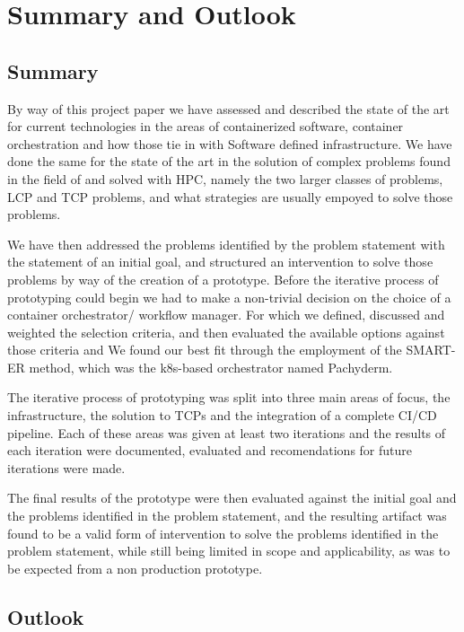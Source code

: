 \chapter{Summary and Outlook}
\label{summary}
 
\section{Summary}

By way of this project paper we have assessed and described the state of the art for current technologies in the areas of 
containerized software, container orchestration and how those tie in with Software defined infrastructure.
We have done the same for the state of the art in the solution of complex problems found in the field of and  solved with \ac{HPC},
namely the two larger classes of problems, \ac{LCP} and \ac{TCP} problems, and what strategies are usually empoyed to solve those problems.

We have then addressed the problems identified by the problem statement with the statement of an initial goal, 
and structured an intervention to solve those problems by way of the creation of a prototype.
Before the iterative process of prototyping could begin we had to make a non-trivial decision on the choice of a container orchestrator/ workflow manager.
For which we defined, discussed and weighted the selection criteria, and then evaluated the available options against those criteria and 
We found our best fit through the employment of the \ac{SMART-ER} method, which was the \ac{k8s}-based orchestrator named Pachyderm.

The iterative process of prototyping was split into three main areas of focus, the infrastructure, the solution to \acp{TCP} and the integration of a complete 
\ac{CI/CD} pipeline. Each of these areas was given at least two iterations and the results of each iteration were documented, evaluated and recomendations for
future iterations were made.

The final results of the prototype were then evaluated against the initial goal and the problems identified in the problem statement,
and the resulting artifact was found to be a valid form of intervention to solve the problems identified in the problem statement,
while still being limited in scope and applicability, as was to be expected from a non production prototype. 


\section{Outlook}




